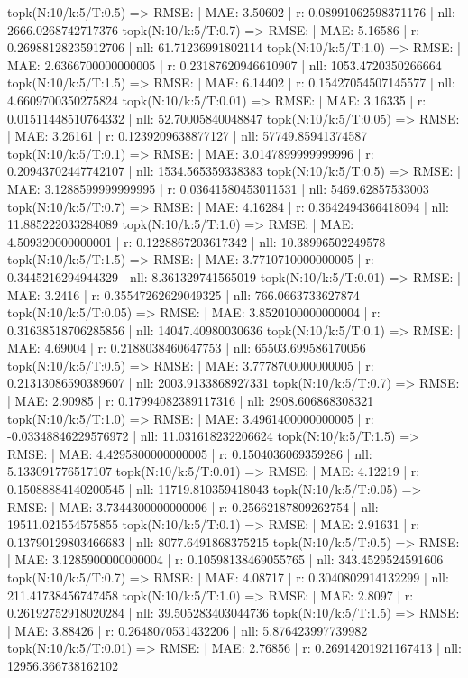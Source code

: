 topk(N:10/k:5/T:0.5) => RMSE: | MAE: 3.50602 | r: 0.08991062598371176 | nll: 2666.0268742717376
topk(N:10/k:5/T:0.7) => RMSE: | MAE: 5.16586 | r: 0.26988128235912706 | nll: 61.71236991802114
topk(N:10/k:5/T:1.0) => RMSE: | MAE: 2.6366700000000005 | r: 0.23187620946610907 | nll: 1053.4720350266664
topk(N:10/k:5/T:1.5) => RMSE: | MAE: 6.14402 | r: 0.15427054507145577 | nll: 4.6609700350275824
topk(N:10/k:5/T:0.01) => RMSE: | MAE: 3.16335 | r: 0.01511448510764332 | nll: 52.70005840048847
topk(N:10/k:5/T:0.05) => RMSE: | MAE: 3.26161 | r: 0.1239209638877127 | nll: 57749.85941374587
topk(N:10/k:5/T:0.1) => RMSE: | MAE: 3.0147899999999996 | r: 0.20943702447742107 | nll: 1534.565359338383
topk(N:10/k:5/T:0.5) => RMSE: | MAE: 3.1288599999999995 | r: 0.03641580453011531 | nll: 5469.62857533003
topk(N:10/k:5/T:0.7) => RMSE: | MAE: 4.16284 | r: 0.3642494366418094 | nll: 11.885222033284089
topk(N:10/k:5/T:1.0) => RMSE: | MAE: 4.509320000000001 | r: 0.1228867203617342 | nll: 10.38996502249578
topk(N:10/k:5/T:1.5) => RMSE: | MAE: 3.7710710000000005 | r: 0.3445216294944329 | nll: 8.361329741565019
topk(N:10/k:5/T:0.01) => RMSE: | MAE: 3.2416 | r: 0.35547262629049325 | nll: 766.0663733627874
topk(N:10/k:5/T:0.05) => RMSE: | MAE: 3.8520100000000004 | r: 0.31638518706285856 | nll: 14047.40980030636
topk(N:10/k:5/T:0.1) => RMSE: | MAE: 4.69004 | r: 0.2188038460647753 | nll: 65503.699586170056
topk(N:10/k:5/T:0.5) => RMSE: | MAE: 3.7778700000000005 | r: 0.21313086590389607 | nll: 2003.9133868927331
topk(N:10/k:5/T:0.7) => RMSE: | MAE: 2.90985 | r: 0.17994082389117316 | nll: 2908.606868308321
topk(N:10/k:5/T:1.0) => RMSE: | MAE: 3.4961400000000005 | r: -0.03348846229576972 | nll: 11.031618232206624
topk(N:10/k:5/T:1.5) => RMSE: | MAE: 4.4295800000000005 | r: 0.1504036069359286 | nll: 5.133091776517107
topk(N:10/k:5/T:0.01) => RMSE: | MAE: 4.12219 | r: 0.15088884140200545 | nll: 11719.810359418043
topk(N:10/k:5/T:0.05) => RMSE: | MAE: 3.7344300000000006 | r: 0.25662187809262754 | nll: 19511.021554575855
topk(N:10/k:5/T:0.1) => RMSE: | MAE: 2.91631 | r: 0.13790129803466683 | nll: 8077.6491868375215
topk(N:10/k:5/T:0.5) => RMSE: | MAE: 3.1285900000000004 | r: 0.10598138469055765 | nll: 343.4529524591606
topk(N:10/k:5/T:0.7) => RMSE: | MAE: 4.08717 | r: 0.3040802914132299 | nll: 211.41738456747458
topk(N:10/k:5/T:1.0) => RMSE: | MAE: 2.8097 | r: 0.26192752918020284 | nll: 39.505283403044736
topk(N:10/k:5/T:1.5) => RMSE: | MAE: 3.88426 | r: 0.2648070531432206 | nll: 5.876423997739982
topk(N:10/k:5/T:0.01) => RMSE: | MAE: 2.76856 | r: 0.26914201921167413 | nll: 12956.366738162102

